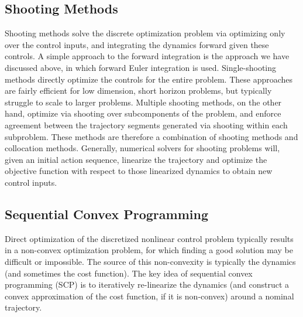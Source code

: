 \subsection{Shooting Methods}

Shooting methods solve the discrete optimization problem via optimizing only over the control inputs, and integrating the dynamics forward given these controls. A simple approach to the forward integration is the approach we have discussed above, in which forward Euler integration is used. Single-shooting methods directly optimize the controls for the entire problem. These approaches are fairly efficient for low dimension, short horizon problems, but typically struggle to scale to larger problems. Multiple shooting methods, on the other hand, optimize via shooting over subcomponents of the problem, and enforce agreement between the trajectory segments generated via shooting within each subproblem. These methods are therefore a combination of shooting methods and collocation methods. Generally, numerical solvers for shooting problems will, given an initial action sequence, linearize the trajectory and optimize the objective function with respect to those linearized dynamics to obtain new control inputs.



\subsection{Sequential Convex Programming}

Direct optimization of the discretized nonlinear control problem typically results in a non-convex optimization problem, for which finding a good solution may be difficult or impossible. The source of this non-convexity is typically the dynamics (and sometimes the cost function). The key idea of sequential convex programming (SCP) is to iteratively re-linearize the dynamics (and construct a convex approximation of the cost function, if it is non-convex) around a nominal trajectory. 

